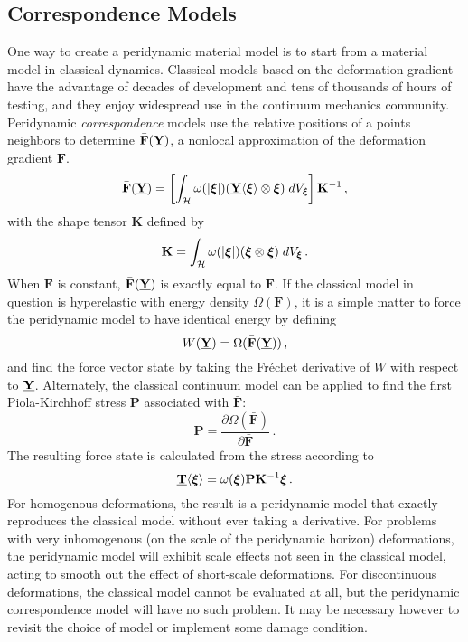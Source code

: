 \subsection{Correspondence Models}
One way to create a peridynamic material model is to start from a material model in classical dynamics.
Classical models based on the deformation gradient have the advantage of decades of development and tens of thousands of hours of testing, and they enjoy widespread use in the continuum mechanics community.
Peridynamic \textit{correspondence} models use the relative positions of a points neighbors to determine $\bar{\mathbf{F}}(\vstate{Y}{}{})$, a nonlocal approximation of the deformation gradient $\mathbf{F}$.
%
\begin{equation}
\label{eq:PDapproxGradient}
\bar{\mathbf{F}}(\vstate{Y}{}{}) = \left[\int_\mathcal{H} \omega(|\boldsymbol{\xi}|)(\vstate{Y}{}{\boldsymbol{\xi}}\otimes \boldsymbol{\xi})\;dV_{\boldsymbol{\xi}} \right]\mathbf{K}^{-1}\, ,
\end{equation}
with the shape tensor $\mathbf{K}$ defined by
\begin{equation}
\mathbf{K} = \int_\mathcal{H}\omega(|\boldsymbol{\xi}|)(\boldsymbol{\xi} \otimes \boldsymbol{\xi})\;dV_{\boldsymbol{\xi}}\, . \notag
\end{equation}
%
When $\mathbf{F}$ is constant, $\bar{\mathbf{F}}(\vstate{Y}{}{})$ is exactly equal to $\mathbf{F}$.
If the classical model in question is hyperelastic with energy density $\Omega(\mathbf{F})$, it is a simple matter to force the peridynamic model to have identical energy by defining
\begin{equation}
W(\vstate{Y}{}{}) = \Omega(\bar{\mathbf{F}}(\vstate{Y}{}{}))\, ,
\end{equation}
and find the force vector state by taking the Fr\'echet derivative of $W$ with respect to $\vstate{Y}{}{}$.
Alternately, the classical continuum model can be applied to find the first Piola-Kirchhoff stress $\mathbf{P}$ associated with $\bar{\mathbf{F}}$:
\begin{equation}
\mathbf{P}=\frac{\partial\Omega(\bar{\mathbf{F}})}{\partial\bar{\mathbf{F}}}\, .
\end{equation}
The resulting force state is calculated from the stress according to
\begin{equation}
\vstate{T}{}{\boldsymbol{\xi}} = \omega(\boldsymbol{\xi})\mathbf{P}\mathbf{K}^{-1}\boldsymbol{\xi}\, .
\end{equation}
For homogenous deformations, the result is a peridynamic model that exactly reproduces the classical model without ever taking a derivative.
For problems with very inhomogenous (on the scale of the peridynamic horizon) deformations, the peridynamic model will exhibit scale effects not seen in the classical model, acting to smooth out the effect of short-scale deformations.
For discontinuous deformations, the classical model cannot be evaluated at all, but the peridynamic correspondence model will have no such problem.
It may be necessary however to revisit the choice of model or implement some damage condition. 
